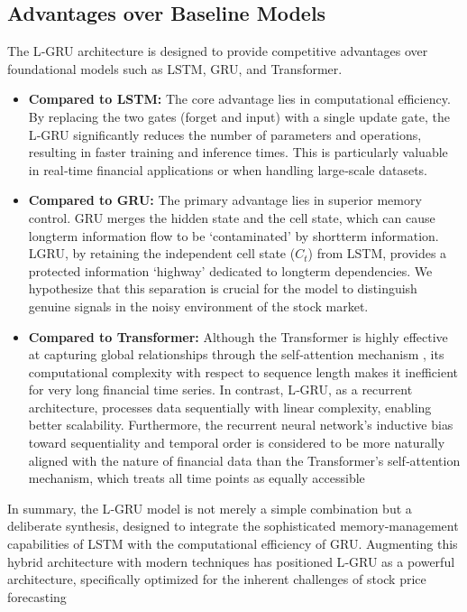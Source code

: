 \documentclass{cys}
\begin{document}
   \subsection{Advantages over Baseline Models}
   The L‑GRU architecture is designed to provide competitive advantages over foundational models such as LSTM, GRU, and Transformer.
   \begin{itemize}
       \item \textbf{Compared to LSTM:}
       The core advantage lies in computational efficiency. By replacing the two gates (forget and input) with a single update gate, the L‑GRU significantly reduces the number of parameters and operations, resulting in faster training and inference times. This is particularly valuable in real‑time financial applications or when handling large‑scale datasets.
       \item \textbf{Compared to GRU:}
       The primary advantage lies in superior memory control. 
       GRU merges the hidden state and the cell state, which can cause long\textendash term information flow to be `contaminated' by short\textendash term information. 
       L\textendash GRU, by retaining the independent cell state ($C_t$) from LSTM, provides a protected information `highway' dedicated to long\textendash term dependencies. 
       We hypothesize that this separation is crucial for the model to distinguish genuine signals in the noisy environment of the stock market.
       \item \textbf{Compared to Transformer:}
       Although the Transformer is highly effective at capturing global relationships through the self‑attention mechanism \cite{vaswani2017attention}, its computational complexity with respect to sequence length makes it inefficient for very long financial time series. In contrast, L‑GRU, as a recurrent architecture, processes data sequentially with linear complexity, enabling better scalability. Furthermore, the recurrent neural network’s inductive bias toward sequentiality and temporal order is considered to be more naturally aligned with the nature of financial data than the Transformer’s self‑attention mechanism, which treats all time points as equally accessible
   \end{itemize}
   In summary, the L‑GRU model is not merely a simple combination but a deliberate synthesis, designed to integrate the sophisticated memory‑management capabilities of LSTM with the computational efficiency of GRU. Augmenting this hybrid architecture with modern techniques has positioned L‑GRU as a powerful architecture, specifically optimized for the inherent challenges of stock price forecasting
\end{document}
